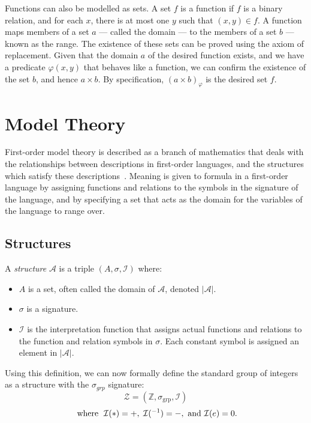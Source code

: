 \documentclass[11pt]{report}
\theoremstyle{definition}
\theoremstyle{theorem}
\theoremstyle{lemma}
\begin{document}
Functions can also be modelled as sets.
A set $f$ is a function if $f$ is a binary relation, and for each $x$, there is at most one $y$ such that $(x,y)\in f$.
A function maps members of a set $a$ --- called the domain --- to the members of a set $b$ --- known as the range.
The existence of these sets can be proved using the axiom of replacement.
Given that the domain $a$ of the desired function exists, and we have a predicate $\varphi(x,y)$ that behaves like a function, we can confirm the existence of the set $b$, and hence $a\times b$.
By specification, $(a\times b)_\varphi$ is the desired set $f$.

\section{Model Theory}
First-order model theory is described as a branch of mathematics that deals with the relationships between descriptions in first-order languages, and the structures which satisfy these descriptions~\cite{stanmodel}.
Meaning is given to formula in a first-order language by assigning functions and relations to the symbols in the signature of the language, and by specifying a set that acts as the domain for the variables of the language to range over.

\subsection{Structures}
A \emph{structure} \cite[ch.~2.1]{selinger} $\mathcal{A}$ is a triple $(A, \sigma,\mathcal{I})$ where:
\begin{itemize}
  \item $A$ is a set, often called the domain of $\mathcal{A}$, denoted $|\mathcal{A}|$.
  \item $\sigma$ is a signature.
  \item $\mathcal I$ is the interpretation function that assigns actual functions and relations to the function and relation symbols in $\sigma$. Each constant symbol is  assigned an element in $|\mathcal{A}|$.
\end{itemize}
Using this definition, we can now formally define the standard group of integers as a structure with the $\sigma_{\mathit{grp}}$ signature:
$$\mathcal{Z} = (\mathbb{Z}, \sigma_{\text{grp}}, \mathcal{I})$$
$$\text{ where \hspace{1mm}} \mathcal{I}(*) = +,\hspace{1mm} \mathcal{I}(^{-1}) = -, \text{ and } \mathcal{I}(e) = 0.$$
\end{document}
